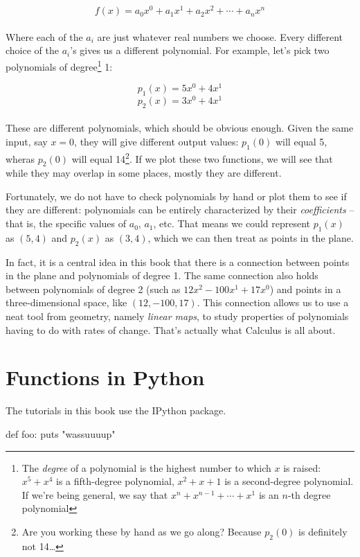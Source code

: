 \[f(x) = a_0 x^0 + a_1 x^1 + a_2 x^2 + \cdots + a_n x^n\]\\

Where each of the $a_i$ are just whatever real numbers we choose. Every different choice of the $a_i$'s gives us a different polynomial. For example, let's pick two polynomials of degree\footnote{The \emph{degree} of a polynomial is the highest number to which $x$ is raised: $x^5 + x^4$ is a fifth-degree polynomial, $x^2 + x + 1$ is a second-degree polynomial. If we're being general, we say that $x^n + x^{n-1} + \cdots + x^1$ is an $n$-th degree polynomial} 1: 

\[p_1(x) = 5 x^0 + 4 x^1\]
\[p_2(x) = 3 x^0 + 4 x^1\]\\

These are different polynomials, which should be obvious enough. Given the same input, say $x=0$, they will give different output values: $p_1(0)$ will equal 5, wheras $p_2(0)$ will equal 14\footnote{Are you working these by hand as we go along? Because $p_2(0)$ is definitely not 14\ldots}. If we plot these two functions, we will see that while they may overlap in some places, mostly they are different. 

Fortunately, we do not have to check polynomials by hand or plot them to see if they are different: polynomials can be entirely characterized by their \emph{coefficients} -- that is, the specific values of $a_0$, $a_1$, etc. That means we could represent $p_1(x)$ as $(5,4)$ and $p_2(x)$ as $(3,4)$, which we can then treat as points in the plane.

In fact, it is a central idea in this book that there is a connection between points in the plane and polynomials of degree 1. The same connection also holds between polynomials of degree 2 (such as $12x^2 - 100x^1 + 17x^0$) and points in a three-dimensional space, like $(12,-100,17)$. This connection allows us to use a neat tool from geometry, namely \emph{linear maps}, to study properties of polynomials having to do with rates of change. That's actually what Calculus is all about.

\section{Functions in Python}
The tutorials in this book use the IPython \cite{PER-GRA:2007} package.

\begin{python}
def foo:
	puts "wassuuuup"
\end{python}